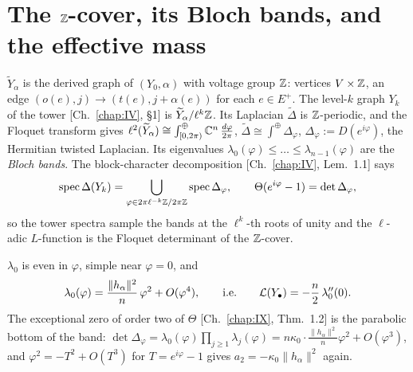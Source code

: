 \section{The \texorpdfstring{$\mathbb{Z}$}{Z}-cover, its Bloch bands, and the effective mass}\label{XIV:sec:bloch}

\begin{definition}\label{XIV:def:cover}
$\widetilde Y_\alpha$ is the derived graph of $(Y_0,\alpha)$ with voltage group $\mathbb{Z}$: vertices
$V\times\mathbb{Z}$, an edge $(o(e),j)\to(t(e),j+\alpha(e))$ for each $e\in E^{+}$. The level-$k$
graph $Y_k$ of the tower [Ch.~\ref{chap:IV}, \S1] is $\widetilde Y_\alpha/\ell^{k}\mathbb{Z}$. Its Laplacian
$\widetilde\Delta$ is $\mathbb{Z}$-periodic, and the Floquet transform gives
$\ell^{2}(\widetilde Y_\alpha)\cong\int^{\oplus}_{[0,2\pi)}\mathbb{C}^{n}\,\frac{d\varphi}{2\pi}$,
$\widetilde\Delta\cong\int^{\oplus}\Delta_\varphi$, $\Delta_\varphi:=D(e^{i\varphi})$,
the Hermitian twisted Laplacian. Its eigenvalues $\lambda_0(\varphi)\le\dots\le\lambda_{n-1}(\varphi)$
are the \emph{Bloch bands}. The block-character decomposition [Ch.~\ref{chap:IV}, Lem.~1.1] says
\[
\operatorname{spec}\Delta(Y_k)=\bigcup_{\varphi\in2\pi\ell^{-k}\mathbb{Z}/2\pi\mathbb{Z}}\operatorname{spec}\Delta_\varphi ,
\qquad
\Theta(e^{i\varphi}-1)=\det\Delta_\varphi ,
\]
so the tower spectra sample the bands at the $\ell^{k}$-th roots of unity and the
$\ell$-adic $L$-function is the Floquet determinant of the $\mathbb{Z}$-cover.
\end{definition}

\begin{theorem}\label{XIV:thm:bloch}
$\lambda_0$ is even in $\varphi$, simple near $\varphi=0$, and
\[
\lambda_0(\varphi)=\frac{\|h_\alpha\|^{2}}{n}\,\varphi^{2}+O(\varphi^{4}),\qquad\text{i.e.}\qquad
\mathcal{L}(Y_\bullet)=-\frac n2\,\lambda_0''(0).
\]
The exceptional zero of order two of $\Theta$ {\rm[Ch.~\ref{chap:IX}, Thm.~1.2]} is the parabolic bottom of
the band: $\det\Delta_\varphi=\lambda_0(\varphi)\prod_{j\ge1}\lambda_j(\varphi)
=n\kappa_0\cdot\frac{\|h_\alpha\|^{2}}n\varphi^{2}+O(\varphi^{3})$, and $\varphi^{2}=-T^{2}+O(T^{3})$
for $T=e^{i\varphi}-1$ gives $a_2=-\kappa_0\|h_\alpha\|^{2}$ again.
\end{theorem}

